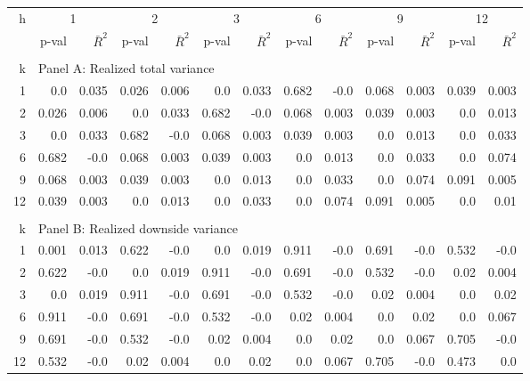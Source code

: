 \documentclass{article}
\begin{document}
\begin{center}
\hspace*{-3cm}
\begin{tabular}{@{\extracolsep{6pt}}rrrrrrrrrrrrr@{}}

\hline

h & \multicolumn{2}{c}{1} & \multicolumn{2}{c}{2} & \multicolumn{2}{c}{3} & \multicolumn{2}{c}{6} & \multicolumn{2}{c}{9} & \multicolumn{2}{c}{12} \\[6pt]

\cline{2-3} \cline{4-5} \cline{6-7} \cline{8-9} \cline{10-11} \cline{12-13}

 & p-val & $\bar{R}^{2}$ & p-val & $\bar{R}^{2}$ &  p-val & $\bar{R}^{2}$ &  
 p-val & $\bar{R}^{2}$ &  p-val & $\bar{R}^{2}$ &  p-val & $\bar{R}^{2}$ \\[6pt]
 
\hline\\[0.000000001pt]

k & \multicolumn{12}{l}{Panel A: Realized total variance} \\[7pt]

\hline

1 & 0.0 & 0.035 & 0.026 & 0.006 & 0.0 & 0.033 & 0.682 & -0.0 & 0.068 & 0.003 & 0.039 & 0.003 \\[6pt]
2 & 0.026 & 0.006 & 0.0 & 0.033 & 0.682 & -0.0 & 0.068 & 0.003 & 0.039 & 0.003 & 0.0 & 0.013 \\[6pt]
3 & 0.0 & 0.033 & 0.682 & -0.0 & 0.068 & 0.003 & 0.039 & 0.003 & 0.0 & 0.013 & 0.0 & 0.033 \\[6pt]
6 & 0.682 & -0.0 & 0.068 & 0.003 & 0.039 & 0.003 & 0.0 & 0.013 & 0.0 & 0.033 & 0.0 & 0.074 \\[6pt]
9 & 0.068 & 0.003 & 0.039 & 0.003 & 0.0 & 0.013 & 0.0 & 0.033 & 0.0 & 0.074 & 0.091 & 0.005 \\[6pt]
12 & 0.039 & 0.003 & 0.0 & 0.013 & 0.0 & 0.033 & 0.0 & 0.074 & 0.091 & 0.005 & 0.0 & 0.01 \\[6pt]
 
\hline\\[0.000000001pt]

k & \multicolumn{12}{l}{Panel B: Realized downside variance} \\[7pt]

\hline

1 & 0.001 & 0.013 & 0.622 & -0.0 & 0.0 & 0.019 & 0.911 & -0.0 & 0.691 & -0.0 & 0.532 & -0.0 \\[6pt]
2 & 0.622 & -0.0 & 0.0 & 0.019 & 0.911 & -0.0 & 0.691 & -0.0 & 0.532 & -0.0 & 0.02 & 0.004 \\[6pt]
3 & 0.0 & 0.019 & 0.911 & -0.0 & 0.691 & -0.0 & 0.532 & -0.0 & 0.02 & 0.004 & 0.0 & 0.02 \\[6pt]
6 & 0.911 & -0.0 & 0.691 & -0.0 & 0.532 & -0.0 & 0.02 & 0.004 & 0.0 & 0.02 & 0.0 & 0.067 \\[6pt]
9 & 0.691 & -0.0 & 0.532 & -0.0 & 0.02 & 0.004 & 0.0 & 0.02 & 0.0 & 0.067 & 0.705 & -0.0 \\[6pt]
12 & 0.532 & -0.0 & 0.02 & 0.004 & 0.0 & 0.02 & 0.0 & 0.067 & 0.705 & -0.0 & 0.473 & 0.0 \\[6pt]


\end{tabular}
\end{center}
\end{document}
